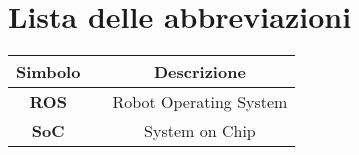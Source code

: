 
\chapter[Lista delle abbreviazioni]{Lista delle abbreviazioni}
\renewcommand{\baselinestretch}{1.5}
\fontsize{14}{14}\selectfont

\begin{center}
\begin{table}[H]
\centering
\setlength{\tabcolsep}{15pt}
\setlength{\extrarowheight}{15pt}
\fontsize{14}{14}\selectfont
\begin{tabular}{ c c c }
\multicolumn{1}{c}{\Large \textbf{Simbolo}} & & \multicolumn{1}{c}{\Large \textbf{Descrizione}}\\
\hline\hline
\textbf{ROS} & & Robot Operating System\\
\textbf{SoC} & & System on Chip\\
\end{tabular}
\end{table}
\end{center}
\newpage